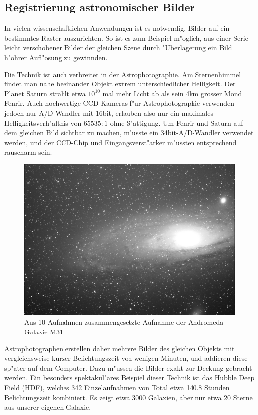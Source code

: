 %
%
%
\subsection{Registrierung astronomischer Bilder}
In vielen wissenschaftlichen Anwendungen ist es notwendig, Bilder auf
ein bestimmtes Raster auszurichten. So ist es zum Beispiel m"oglich,
aus einer Serie leicht verschobener Bilder der gleichen Szene durch
"Uberlagerung ein Bild h"ohrer Aufl"osung zu gewinnden.

Die Technik ist auch verbreitet in der Astrophotographie. Am Sternenhimmel
findet man nahe beeinander Objekt extrem unterschiedlicher Helligkeit.
Der Planet Saturn strahlt etwa $10^{10}$ mal mehr Licht ab als sein
4km grosser Mond Fenrir.
Auch hochwertige CCD-Kameras f"ur Astrophotographie verwenden jedoch nur
A/D-Wandler mit 16bit, erlauben also nur ein maximales
Helligkeitsverh"altnis von $65535 : 1$ ohne S"attigung.
Um Fenrir und Saturn auf dem gleichen Bild sichtbar zu machen, m"usste
ein 34bit-A/D-Wandler verwendet werden, und der CCD-Chip und
Eingangsverst"arker m"ussten entsprechend rauscharm sein.

\begin{figure}
\begin{center}
\includegraphics[width=\hsize]{graphics/andromeda-gimped.jpg}
\end{center}
\caption{Aus 10 Aufnahmen zusammengesetzte Aufnahme der Andromeda Galaxie
M31.\label{andromeda-image}}
\end{figure}

Astrophotographen erstellen daher mehrere Bilder des gleichen Objekts
mit vergleichsweise kurzer Belichtungszeit von wenigen Minuten, und
addieren diese sp"ater auf dem Computer. Dazu m"ussen die Bilder
exakt zur Deckung gebracht werden.
Ein besonders spektakul"ares Beispiel dieser Technik ist das Hubble
Deep Field (HDF), welches 342 Einzelaufnahmen von Total
etwa 140.8 Stunden Belichtungszeit kombiniert.
Es zeigt etwa 3000 Galaxien, aber nur etwa 20 Sterne aus unserer eigenen
Galaxie. 


